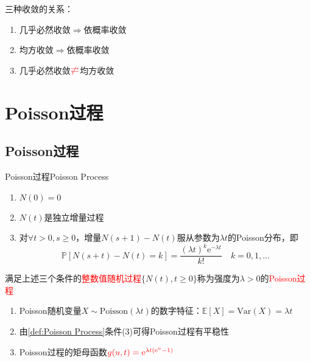\documentclass{elegantbook}
\newcommand\var{\text{Var}}
\newcommand\p{\mathbb{P}}
\newcommand\e{\mathrm{e}}
\newcommand\E{\mathbb{E}}
\begin{document}
\begin{remark}
    三种收敛的关系：
    \begin{enumerate}
        \item 几乎必然收敛$\Rightarrow$依概率收敛
        \item 均方收敛$\Rightarrow$依概率收敛
        \item 几乎必然收敛$\color{red} \not \rightleftarrows$均方收敛
    \end{enumerate}
    \begin{center}
    \end{center}
\end{remark}

\chapter{Poisson过程}
\section{Poisson过程}
\begin{definition}{Poisson过程}{Poisson Process}
    \begin{enumerate}
        \item $N(0)=0$
        \item $N(t)$是独立增量过程
        \item 对$\forall t>0,s\geq 0$，增量$N(s+1)-N(t)$服从参数为$\lambda t$的Poisson分布，即\[\p [N(s+t)-N(t)=k]=\frac{(\lambda t)^k\e ^{-\lambda t}}{k!}\quad k=0,1,\dots\]
    \end{enumerate}
    满足上述三个条件的\textcolor{red}{整数值随机过程}$\{N(t),t\geq 0\}$称为强度为$\lambda >0$的\textcolor{red}{Poisson过程}
\end{definition}
\begin{remark}
    \begin{enumerate}
        \item Poisson随机变量$X\sim \text{Poisson}(\lambda t)$的数字特征：$\E [X]=\var (X)=\lambda t$
        \item 由\ref{def:Poisson Process}条件(3)可得Poisson过程有平稳性
        \item Poisson过程的矩母函数$\color{red}g(u,t)=\e ^{\lambda t(\e ^{u}-1)}$
    \end{enumerate}
\end{remark}
\end{document}
